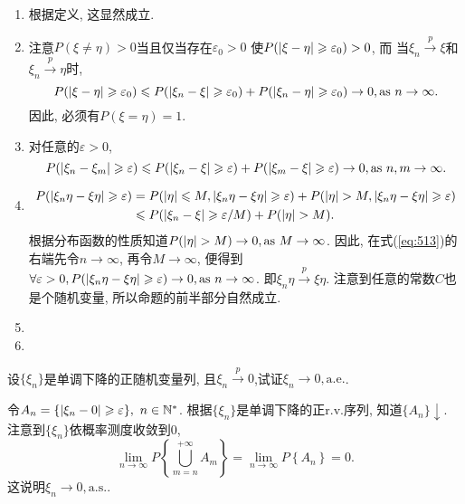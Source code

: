 	\begin{yyProof}
		\begin{enumerate}
			\item 根据定义, 这显然成立.
			\item 注意$P(\xi\neq\eta)> 0$当且仅当存在$\varepsilon_0>0$ 使$P(\lvert\xi-\eta\rvert\geqslant\varepsilon_0)>0$, 而
			当$\xi_n\stackrel{p}{\rightarrow}\xi$和 $\xi_n\stackrel{p}{\rightarrow}\eta$时,
			\begin{equation}
				P(\lvert\xi-\eta\rvert\geqslant\varepsilon_0)\leqslant P(\lvert\xi_n-\xi\rvert\geqslant\varepsilon_0) + P(\lvert\xi_n-\eta\rvert\geqslant\varepsilon_0)\to 0, \text{as}~n\to\infty.
			\end{equation}
			因此, 必须有$P(\xi=\eta) = 1$.
			\item 对任意的$\varepsilon>0$, \begin{equation}
			P(\lvert\xi_n-\xi_m\rvert\geqslant\varepsilon)\leqslant P(\lvert\xi_n-\xi\rvert\geqslant\varepsilon) + P(\lvert\xi_m-\xi\rvert\geqslant\varepsilon)\to 0, \text{as}~n,m\to\infty.
			\end{equation}
			\item \begin{align}\label{eq:513}
				P(\lvert\xi_n\eta-\xi\eta\rvert\geqslant\varepsilon) &= P(\lvert\eta\rvert\leqslant M, \lvert\xi_n\eta-\xi\eta\rvert\geqslant\varepsilon) + P(\lvert\eta\rvert> M, \lvert\xi_n\eta-\xi\eta\rvert\geqslant\varepsilon)\nonumber\\
				&\leqslant P(\lvert\xi_n-\xi\rvert\geqslant \varepsilon/M) + P(\lvert\eta\rvert>M).
			\end{align}
			根据分布函数的性质知道$P(\lvert\eta\rvert>M)\to 0, \text{as}~M\to\infty$.
			因此, 在式(\ref{eq:513})的右端先令$n\to\infty$, 再令$M\to\infty$, 便得到$\forall \varepsilon>0, P(\lvert\xi_n\eta-\xi\eta\rvert\geqslant\varepsilon)\to 0, \text{as}~n\to\infty$. 即$\xi_n\eta\stackrel{p}{\rightarrow}\xi\eta$. 注意到任意的常数$C$也是个随机变量, 所以命题的前半部分自然成立.
			\item 
			\item 
		\end{enumerate}
	\end{yyProof}
	
	\begin{yyEx}
		设$\{\xi_n\}$是单调下降的正随机变量列, 且$\xi_n\stackrel{p}{\rightarrow}0$,试证$\xi_n\to 0,\mathrm{a.e.}$.
	\end{yyEx}
	\begin{yyProof}
		令$A_n = \{ \lvert\xi_n-0\rvert\geqslant \varepsilon \},~n\in\mathbb{N}^*$. 根据$\{\xi_n\}$是单调下降的正r.v.序列, 知道$\{A_n\} \downarrow$. 注意到$\{\xi_n\}$依概率测度收敛到$0$, \begin{equation}
			\lim_{n\to\infty}P\left\{ \bigcup_{m=n}^{+\infty}A_m \right\} = \lim_{n\to\infty}P\left\{ A_n \right\} = 0.
		\end{equation}
		这说明$\xi_n\to 0,\mathrm{a.s.}$.
	\end{yyProof}
	
